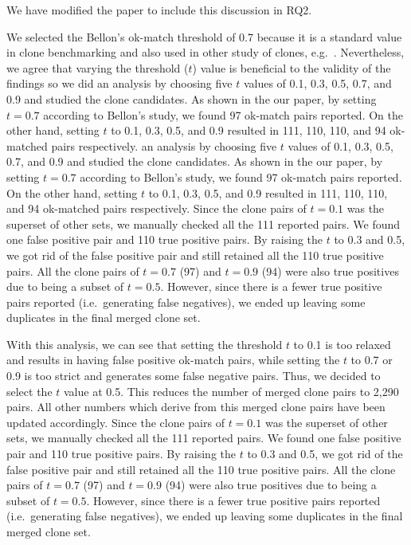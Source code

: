 \documentclass[a4paper,twoside,10pt]{reviewresponse}
\begin{document}
We have modified the paper to include this discussion in RQ2.


We selected the Bellon's ok-match threshold of 0.7 because it is a standard value in clone benchmarking \citep{Bellon2007} and also used in other study of clones, e.g.~\cite{Sajnani2016}. Nevertheless, we agree that varying the threshold ($t$) value is beneficial to the validity of the findings so we did an analysis by choosing five $t$ values of 0.1, 0.3, 0.5, 0.7, and 0.9 and studied the clone candidates. As shown in the our paper, by setting $t=0.7$ according to Bellon's study, we found 97 ok-match pairs reported. On the other hand, setting $t$ to 0.1, 0.3, 0.5, and 0.9 resulted in 111, 110, 110, and 94 ok-matched pairs respectively. an analysis by choosing five $t$ values of 0.1, 0.3, 0.5, 0.7, and 0.9 and studied the clone candidates. As shown in the our paper, by setting $t=0.7$ according to Bellon's study, we found 97 ok-match pairs reported. On the other hand, setting $t$ to 0.1, 0.3, 0.5, and 0.9 resulted in 111, 110, 110, and 94 ok-matched pairs respectively.
Since the clone pairs of $t=0.1$ was the superset of other sets,  we manually checked all the 111 reported pairs.
We found one false positive pair and 110 true positive pairs. By raising the $t$ to 0.3 and 0.5, we got rid of the false positive pair and still retained all the 110 true positive pairs. All the clone pairs of $t=0.7$ (97) and $t=0.9$ (94) were also true positives due to being a subset of $t=0.5$. However, since there is a fewer true positive pairs reported (i.e.~generating false negatives), we ended up leaving some duplicates in the final merged clone set.

With this analysis, we can see that setting the threshold $t$ to 0.1 is too relaxed and results in having false positive ok-match pairs, while setting the $t$ to 0.7 or 0.9 is too strict and generates some false negative pairs. Thus, we decided to select the $t$ value at 0.5. This reduces the number of merged clone pairs to 2,290 pairs. All other numbers which derive from this merged clone pairs have been updated accordingly.
Since the clone pairs of $t=0.1$ was the superset of other sets,  we manually checked all the 111 reported pairs.
We found one false positive pair and 110 true positive pairs. By raising the $t$ to 0.3 and 0.5, we got rid of the false positive pair and still retained all the 110 true positive pairs. All the clone pairs of $t=0.7$ (97) and $t=0.9$ (94) were also true positives due to being a subset of $t=0.5$. However, since there is a fewer true positive pairs reported (i.e.~generating false negatives), we ended up leaving some duplicates in the final merged clone set.
\end{document}
